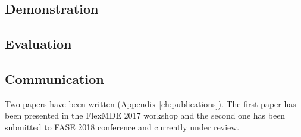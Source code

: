 \documentclass[12pt, a4paper]{report} \usepackage[titletoc]{appendix}
\begin{document}
\subsection{Demonstration}
\label{subsec:demonstration}

\subsection{Evaluation}
\label{subsec:evaluation}

\subsection{Communication}
\label{subsec:communication}
Two papers have been written (Appendix \ref{ch:publications}). The first paper \cite{yohannis2017turning} has been presented in the FlexMDE 2017 workshop and the second one \cite{yohannis2018algorithm} has been submitted to FASE 2018 conference and currently under review.
\end{document}
